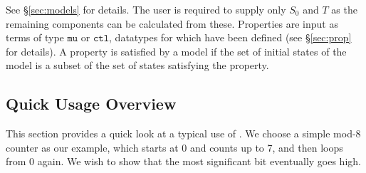 See \S\ref{sec:models} for details. The user is required to supply only \( S_0 \) and \( T \) as the remaining components can be calculated from these. Properties are input as \HOL{} terms of type \(\mathtt{mu}\) or \(\mathtt{ctl}\), \HOL{} datatypes for which have been defined (see \S\ref{sec:prop} for details). A property is satisfied by a model if the set of initial states of the model is a subset of the set of states satisfying the property.

\subsection{Quick Usage Overview}

This section provides a quick look at a typical use of \hc{}. We choose a simple mod-8 counter as our example, which starts at 0 and counts up to 7, and then loops from 0 again. We wish to show that the most significant bit eventually goes high.

